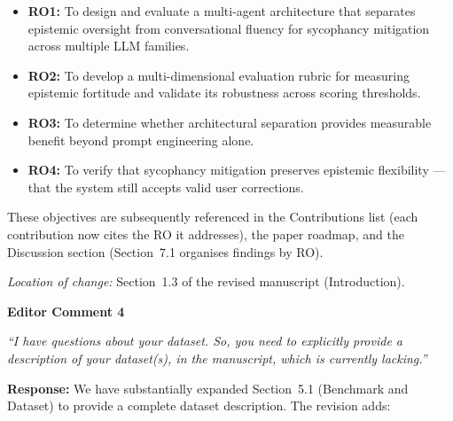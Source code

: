 \documentclass[12pt,a4paper]{article}
\begin{document}
\begin{itemize}[nosep]
  \item \textbf{RO1:} To design and evaluate a multi-agent architecture that separates epistemic oversight from conversational fluency for sycophancy mitigation across multiple LLM families.
  \item \textbf{RO2:} To develop a multi-dimensional evaluation rubric for measuring epistemic fortitude and validate its robustness across scoring thresholds.
  \item \textbf{RO3:} To determine whether architectural separation provides measurable benefit beyond prompt engineering alone.
  \item \textbf{RO4:} To verify that sycophancy mitigation preserves epistemic flexibility --- that the system still accepts valid user corrections.
\end{itemize}

These objectives are subsequently referenced in the Contributions list (each contribution now cites the RO it addresses), the paper roadmap, and the Discussion section (Section~7.1 organises findings by RO).

\textit{Location of change:} Section~1.3 of the revised manuscript (Introduction).

\vspace{0.5cm}


\noindent \textbf{Editor Comment 4}

\begin{editorbox}
\textit{``I have questions about your dataset. So, you need to explicitly provide a description of your dataset(s), in the manuscript, which is currently lacking.''}
\end{editorbox}

\textbf{Response:} We have substantially expanded Section~5.1 (Benchmark and Dataset) to provide a complete dataset description. The revision adds:
\end{document}
